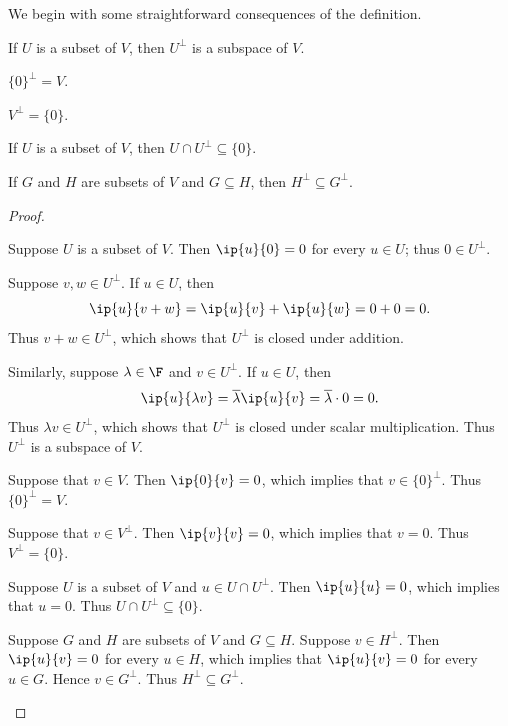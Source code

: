 We begin with some straightforward consequences of the definition.

\begin{result}\label{ax:6.48}\leavevmode
\begin{parts}
\item If $U$ is a subset of $V$, then $U^\perp$ is a subspace of $V$.
\item $\{0\}^\perp=V$.
\item $V^\perp=\{0\}$.
\item If $U$ is a subset of $V$, then $U\cap U^\perp\subseteq\{0\}$.
\item If $G$ and $H$ are subsets of $V$ and $G\subseteq H$, then
  $H^\perp\subseteq G^\perp$.
\end{parts}
\end{result}

\begin{proof}\leavevmode
\begin{parts}
\item Suppose $U$ is a subset of $V$. Then $\ip{u}{0}=0$ for every $u\in U$;
  thus $0\in U^\perp$.

  Suppose $v,w\in U^\perp$. If $u\in U$, then
  \[ \ip{u}{v+w} = \ip{u}{v}+\ip{u}{w} = 0+0 = 0. \]
  Thus $v+w\in U^\perp$, which shows that $U^\perp$ is closed under addition.

  Similarly, suppose $\lambda\in\F$ and $v\in U^\perp$. If $u\in U$, then
  \[ \ip{u}{\lambda v} = \overline{\lambda}\ip{u}{v}
     = \overline{\lambda}\cdot0 = 0. \]
  Thus $\lambda v\in U^\perp$, which shows that $U^\perp$ is closed under
  scalar multiplication. Thus $U^\perp$ is a subspace of $V$.
\item Suppose that $v\in V$. Then $\ip{0}{v}=0$, which implies that
  $v\in\{0\}^\perp$. Thus $\{0\}^\perp=V$.
\item Suppose that $v\in V^\perp$. Then $\ip{v}{v}=0$, which implies that
  $v=0$. Thus $V^\perp=\{0\}$.
\item Suppose $U$ is a subset of $V$ and $u\in U\cap U^\perp$. Then
  $\ip{u}{u}=0$, which implies that $u=0$. Thus $U\cap U^\perp\subseteq\{0\}$.
\item Suppose $G$ and $H$ are subsets of $V$ and $G\subseteq H$. Suppose
  $v\in H^\perp$. Then $\ip{u}{v}=0$ for every $u\in H$, which implies that
  $\ip{u}{v}=0$ for every $u\in G$. Hence $v\in G^\perp$. Thus
  $H^\perp\subseteq G^\perp$. \qedhere
\end{parts}
\end{proof}


